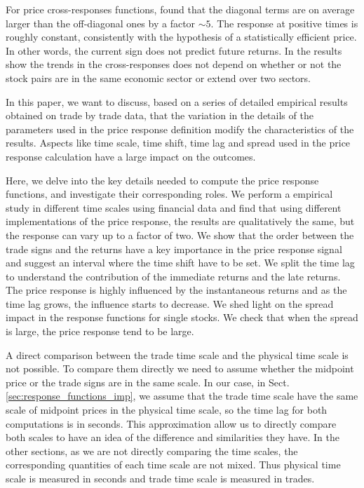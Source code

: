 For price cross-responses functions, \cite{dissecting_cross} found that the
diagonal terms are on average larger than the off-diagonal ones by a factor
$\sim 5$. The response at positive times is roughly constant, consistently with
the hypothesis of a statistically efficient price. In other words, the current
sign does not predict future returns. In \cite{Wang_2016_cross} the results
show the trends in the cross-responses does not depend on whether or not the
stock pairs are in the same economic sector or extend over two sectors.

In this paper, we want to discuss, based on a series of detailed empirical
results obtained on trade by trade data, that the variation in the details of
the parameters used in the price response definition modify the characteristics
of the results. Aspects like time scale, time shift, time lag and spread used
in the price response calculation have a large impact on the outcomes.

Here, we delve into the key details needed to compute the price response
functions, and investigate their corresponding roles. We perform a empirical
study in different time scales using financial data and find that using
different implementations of the price response, the results are qualitatively
the same, but the response can vary up to a factor of two. We show that the
order between the trade signs and the returns have a key importance in the
price response signal and suggest an interval where the time shift have to be
set. We split the time lag to understand the contribution of the immediate
returns and the late returns. The price response is highly influenced by the
instantaneous returns and as the time lag grows, the influence starts to
decrease. We shed light on the spread impact in the response functions for
single stocks. We check that when the spread is large, the price response tend
to be large.

A direct comparison between the trade time scale and the physical time scale is
not possible. To compare them directly we need to assume whether the midpoint
price or the trade signs are in the same scale. In our case, in Sect.
\ref{sec:response_functions_imp}, we assume that the trade time scale have the
same scale of midpoint prices in the physical time scale, so the time lag for
both computations is in seconds. This approximation allow us to directly
compare both scales to have an idea of the difference and similarities they
have. In the other sections, as we are not directly comparing the time scales,
the corresponding quantities of each time scale are not mixed. Thus physical
time scale is measured in seconds and trade time scale is measured in trades.

